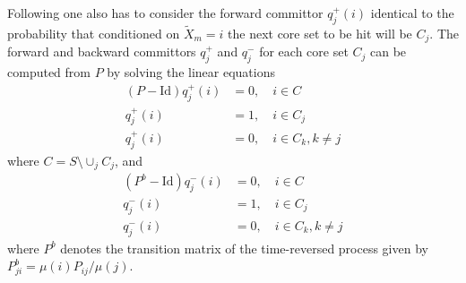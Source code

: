 \documentclass[aps, pre, preprint,unsortedaddress,a4paper,onecolumn]{revtex4}
\newcommand{\fwd}[0]{+}
\newcommand{\bwd}[0]{-}
\newcommand{\id}{\mathrm{Id}}
\begin{document}
Following \cite{discreteTPT} one also has to consider the forward committor $q^\fwd_j(i)$ identical to the probability  that conditioned on $\tilde X_m=i$ the next core set to be hit will be $C_j$.
The forward and backward committors $q^\fwd_j$ and $q^\bwd_j$  for each core set $C_j$ can be computed from $P$ by solving the linear equations \cite{discreteTPT}
\begin{align}
(P-\id) q^\fwd_j(i) & =  0, \quad i\in C\label{qfwd}\\
q^\fwd_j(i) & =  1,\quad i\in C_j\nonumber\\
q^\fwd_j(i) & =  0,\quad i\in C_k,k\not=j\nonumber
\end{align}
where $C=S\setminus\cup_j C_j$, and
\begin{align}
(P^b-\id) q^\bwd_j(i) & =  0, \quad i\in C\label{qbwd}\\
q^\bwd_j(i) & =  1,\quad i\in C_j\nonumber \\
q^\bwd_j(i) & =  0,\quad i\in C_k,k\not=j\nonumber
\end{align}
where $P^b$ denotes the transition matrix of the time-reversed process
given by $P^b_{ji}=\mu(i) P_{ij}/\mu(j)$.
\end{document}
